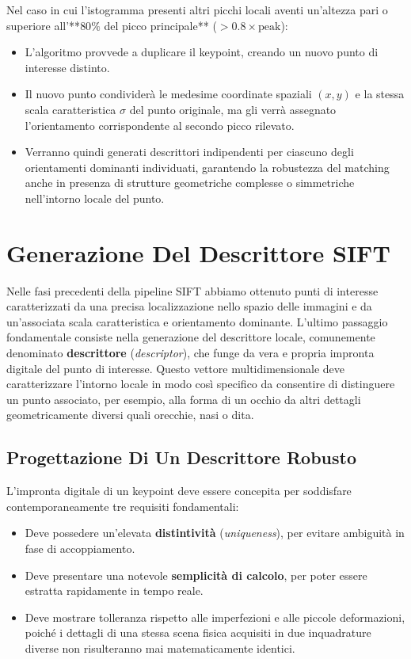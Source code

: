 ﻿\documentclass[11pt, a4paper]{article}
\begin{document}
Nel caso in cui l'istogramma presenti altri picchi locali aventi un'altezza pari o superiore all'**$80\%$ del picco principale** ($> 0.8 \times \text{peak}$):
\begin{itemize}
    \item L'algoritmo provvede a duplicare il keypoint, creando un nuovo punto di interesse distinto.
    \item Il nuovo punto condividerà le medesime coordinate spaziali $(x, y)$ e la stessa scala caratteristica $\sigma$ del punto originale, ma gli verrà assegnato l'orientamento corrispondente al secondo picco rilevato.
    \item Verranno quindi generati descrittori indipendenti per ciascuno degli orientamenti dominanti individuati, garantendo la robustezza del matching anche in presenza di strutture geometriche complesse o simmetriche nell'intorno locale del punto.
\end{itemize}

\section{Generazione Del Descrittore SIFT}

Nelle fasi precedenti della pipeline SIFT abbiamo ottenuto punti di interesse caratterizzati da una precisa localizzazione nello spazio delle immagini e da un'associata scala caratteristica e orientamento dominante. L'ultimo passaggio fondamentale consiste nella generazione del descrittore locale, comunemente denominato \textbf{descrittore} (\emph{descriptor}), che funge da vera e propria impronta digitale del punto di interesse. Questo vettore multidimensionale deve caratterizzare l'intorno locale in modo così specifico da consentire di distinguere un punto associato, per esempio, alla forma di un occhio da altri dettagli geometricamente diversi quali orecchie, nasi o dita.

\subsection{Progettazione Di Un Descrittore Robusto}

L'impronta digitale di un keypoint deve essere concepita per soddisfare contemporaneamente tre requisiti fondamentali:
\begin{itemize}
    \item Deve possedere un'elevata \textbf{distintività} (\emph{uniqueness}), per evitare ambiguità in fase di accoppiamento.
    \item Deve presentare una notevole \textbf{semplicità di calcolo}, per poter essere estratta rapidamente in tempo reale.
    \item Deve mostrare tolleranza rispetto alle imperfezioni e alle piccole deformazioni, poiché i dettagli di una stessa scena fisica acquisiti in due inquadrature diverse non risulteranno mai matematicamente identici.
\end{itemize}
\end{document}
